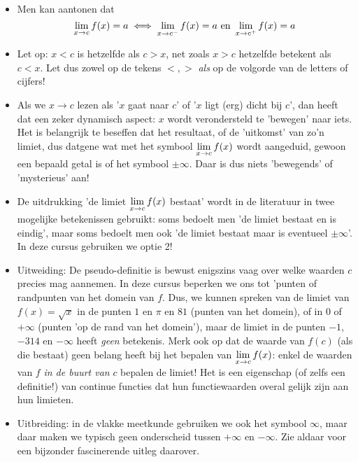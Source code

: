 \documentclass{ximera}
\begin{document}
\begin{remark} \ 

\begin{itemize}	
\item Men kan aantonen dat 
$$
	\limxc  f(x) = a \iff 	\llimxc  f(x) = a \text{ en } 	\rlimxc  f(x) = a
$$
\item Let op: $x<c$ is hetzelfde als  $c>x$, net zoals  $x>c$ hetzelfde betekent als $c<x$. Let dus zowel op de tekens $<,>$ \textit{als} op de volgorde van de letters of cijfers!  

\item Als we  $x\to c$ lezen als '$x$ gaat naar $c$' of '$x$ ligt (erg) dicht bij $c$', dan heeft dat een zeker dynamisch aspect: $x$ wordt verondersteld te 'bewegen' naar iets. Het is belangrijk te beseffen dat het resultaat, of de 'uitkomst' van zo'n limiet, dus datgene wat met het symbool $\limxc f(x)$ wordt aangeduid, gewoon een bepaald getal is of het symbool $\pm\infty$. Daar is dus niets 'bewegends' of 'mysterieus' aan!

\item De uitdrukking 'de limiet $\limxc f(x)$ bestaat' wordt in de literatuur in twee mogelijke betekenissen gebruikt: soms bedoelt men 'de limiet bestaat en is eindig', maar soms bedoelt men ook 'de limiet bestaat maar is eventueel $\pm\infty$'. In deze cursus gebruiken we optie 2! 

\item Uitweiding: De pseudo-definitie is bewust enigszins vaag over welke waarden $c$ precies mag aannemen. In deze cursus beperken we ons tot 'punten of randpunten van het domein van $f$. Dus, we kunnen spreken van de limiet van $f(x)=\sqrt{x}$ in de punten $1$ en $\pi$ en $81$ (punten van het domein), of in $0$ of $+\infty$ (punten 'op de rand van het domein'), maar de limiet in de punten $-1$, $-314$ en $-\infty$ heeft \textit{geen} betekenis. Merk ook op dat de waarde van $f(c)$ (als die bestaat) geen belang heeft bij het bepalen van $\limxg{c}f(x)$: enkel de waarden van $f$ \textit{in de buurt van} $c$ bepalen de limiet! Het is een eigenschap (of zelfs een definitie!) van continue functies dat hun functiewaarden overal gelijk zijn aan hun limieten.

\item Uitbreiding: in de vlakke meetkunde gebruiken we ook het symbool $\infty$, maar daar maken we typisch geen onderscheid tussen $+\infty$ en $-\infty$. Zie aldaar voor een bijzonder fascinerende uitleg daarover.

\end{itemize}

\end{remark}
\end{document}

